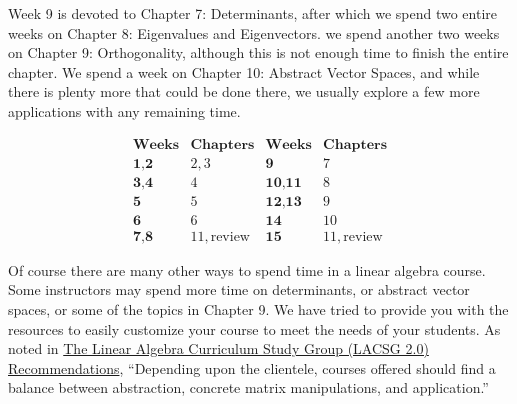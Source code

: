 \documentclass{ximera}
\begin{document}
Week 9 is devoted to Chapter 7: Determinants, after which we spend two entire weeks on Chapter 8: Eigenvalues and Eigenvectors.  we spend another two weeks on Chapter 9: Orthogonality, although this is not enough time to finish the entire chapter.  We spend a week on Chapter 10: Abstract Vector Spaces, and while there is plenty more that could be done there, we usually explore a few more applications with any remaining time.


$$\begin{array}{cc|cc}
\hline
\textbf{Weeks} & \textbf{Chapters} &  \textbf{Weeks} & \textbf{Chapters} \\ \hline
		\textbf{1,2} & 2,3 &  \textbf{9} &  7 \\
		\textbf{3,4} &  4 &  \textbf{10,11} &  8  \\
		\textbf{5} &  5 &  \textbf{12,13} &  9 \\
		\textbf{6} &  6 &  \textbf{14} &  10\\
		\textbf{7,8} &  11, \text{review} &  \textbf{15} &  11, \text{review}
  \end{array}$$

Of course there are many other ways to spend time in a linear algebra course.  Some instructors may spend more time on determinants, or abstract vector spaces, or some of the topics in Chapter 9.  We have tried to provide you with the resources to easily customize your course to meet the needs of your students.  As noted in \href{https://dx.doi.org/10.1090/noti2479}{The Linear Algebra Curriculum Study Group (LACSG 2.0) Recommendations}, ``Depending upon the clientele, courses offered
should find a balance between abstraction, concrete matrix manipulations, and application.'' 



\end{document}
